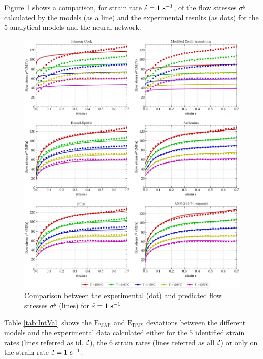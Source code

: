 \documentclass[metals,article,submit,pdftex,moreauthors]{Definitions/mdpi}
\DeclareRobustCommand{\mdot}[1]{\accentset{\mbox{\bfseries .}}{#1}}
\DeclareRobustCommand{\RMSE}{\text{E}_\text{RMS}}
\DeclareRobustCommand{\MARE}{\text{E}_\text{MAR}}
\DeclareRobustCommand{\ps}{\text{s}^{-1}}
\begin{document}
Figure \ref{fig:CompInt} shows a comparison, for strain rate $\mdot\varepsilon=1~\ps$, of the flow stresses $\sigma^y$ calculated by the models (as a line) and the experimental results (as dots) for the 5 analytical models and the neural network.
\begin{figure}[!ht]
\centering
\includegraphics[width=\columnwidth]
{Figures/CompInt}
\caption{Comparison between the experimental (dot) and predicted flow stresses $\sigma^y$ (lines) for $\mdot\varepsilon=1~\ps$}
\label{fig:CompInt}
\end{figure}
Table \ref{tab:IntVal} shows the $\MARE$ and $\RMSE$ deviations between the different models and the experimental data calculated either for the $5$ identified strain rates (lines referred as id. $\mdot\varepsilon$), the $6$ strain rates (lines referred as all $\mdot\varepsilon$) or only on the strain rate $\mdot\varepsilon=1~\ps$.
\end{document}
